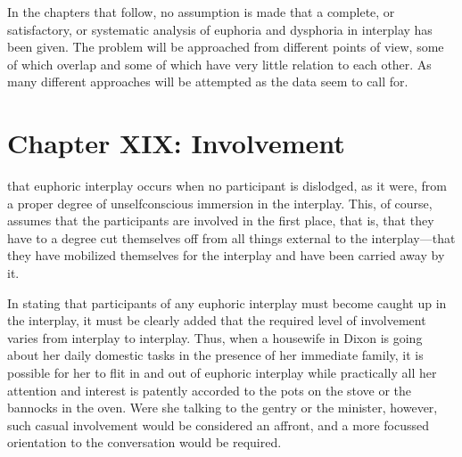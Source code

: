 \documentclass[openany,nobib]{tufte-book}
\let\oldchapter\chapter
\def\chapter{%
  \setcounter{footnote}{0}%
  \oldchapter
}
\begin{document}
In the chapters that follow, no assumption is made that a complete, or
satisfactory, or systematic analysis of euphoria and dysphoria in
interplay has been given. The problem will be approached from different
points of view, some of which overlap and some of which have very little
relation to each other. As many different approaches will be attempted
as the data seem to call for.

\chapter[CHAPTER XIX: INVOLVEMENT]{Chapter XIX: Involvement}
\label{ch:Chapter XIX: Involvement}

that euphoric interplay occurs when no participant
is dislodged, as it were, from a proper degree of unselfconscious
immersion in the interplay. This, of course, assumes that the
participants are involved in the first place, that is, that they have to
a degree cut themselves off from all things external to the
interplay---that they have mobilized themselves for the interplay and
have been carried away by it.

In stating that participants of any euphoric interplay must become
caught up in the interplay, it must be clearly added that the required
level of involvement varies from interplay to interplay. Thus, when a
housewife in Dixon is going about her daily domestic tasks in the
presence of her immediate family, it is possible for her to flit in and
out of euphoric interplay while practically all her attention and
interest is patently accorded to the pots on the stove or the bannocks
in the oven. Were she talking to the gentry or the minister, however,
such casual involvement would be considered an affront, and a more
focussed orientation to the conversation would be required.
\end{document}
